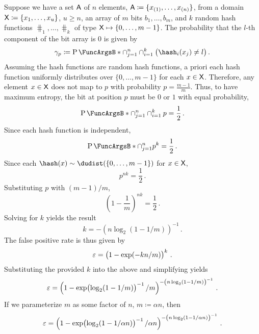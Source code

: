 \documentclass[ ../main.tex]{subfiles}
\begin{document}
Suppose we have a set $\Set{A}$ of $n$ elements, $\Set{A} \coloneqq \{x_{(1)},\ldots,x_{(n)}\}$, from a domain $\Set{X} \coloneqq \{x_1,\ldots,x_u\}$, $u \geq n$, an array of $m$ bits $b_1,\ldots,b_m$, and $k$ random hash functions $\hash_1,\ldots,\hash_k$ of type $\Set{X} \mapsto \{0,\ldots,m-1\}$.
The probability that the $l$-th component of the bit array is $0$ is given by
\begin{equation}
    \gamma_p \coloneqq \Prob{\cap_{j=1}^{n} \cap_{i=1}^{k} \left(\hash_i(x_j) \neq l\right)}\,.
\end{equation}
Assuming the hash functions are random hash functions, a priori each hash function uniformly distributes over $\{0,\ldots,m-1\}$ for each $x \in \Set{X}$.
Therefore, any element $x \in \Set{X}$ does not map to $p$ with probability $p = \frac{m-1}{m}$.
Thus, to have maximum entropy, the bit at position $p$ must be $0$ or $1$ with equal probability,
\begin{equation}
    \Prob{\cap_{j=1}^{n} \cap_{i=1}^{k} p} = \frac{1}{2}\,.
\end{equation}
Since each hash function is independent,
\begin{equation}
    \Prob{\cap_{j=1}^{n} p^k} = \frac{1}{2}\,.
\end{equation}
Since each $\hash(x) \sim \dudist(\{0,\ldots,m-1\})$ for $x \in \Set{X}$,
\begin{equation}
    p^{n k} = \frac{1}{2}\,.
\end{equation}
Substituting $p$ with $(m-1)/m$,
\begin{equation}
    \left(1-\frac{1}{m}\right)^{n k} = \frac{1}{2}\,.
\end{equation}
Solving for $k$ yields the result
\begin{equation}
    k = -\left(n \log_2(1-1/m)\right)^{-1}\,.
\end{equation}
The false positive rate is thus given by
\begin{equation}
    \varepsilon = \left(1-\exp(-kn/m)\right)^{k}\,.
\end{equation}
Substituting the provided $k$ into the above and simplifying yields
\begin{equation}
    \varepsilon = \left(1-\exp\!\left( \log_2(1-1/m)\right)^{-1}/m\right)^{-\left(n \log_2(1-1/m)\right)^{-1}}\,.
\end{equation}
If we parameterize $m$ as some factor of $n$, $m \coloneqq \alpha n$, then
\begin{equation}
    \varepsilon = \left(1-\exp\!\left( \log_2(1-1/\alpha n)\right)^{-1}/\alpha n\right)^{-\left(n \log_2(1-1/\alpha n)\right)^{-1}}\,.
\end{equation}
\end{document}
